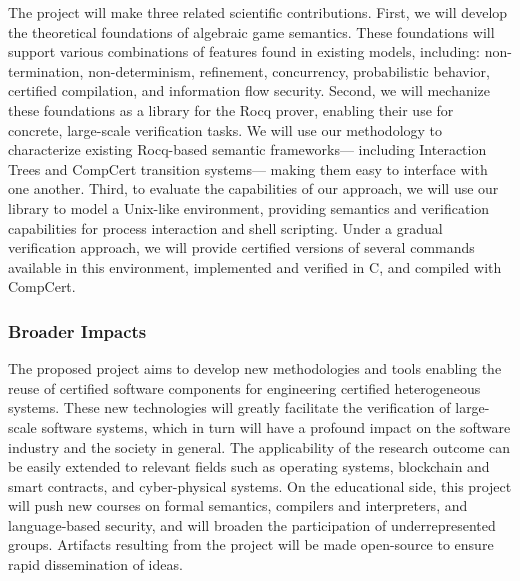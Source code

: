The project will make three related scientific contributions.
First,
we will develop the theoretical foundations of algebraic game semantics.
These foundations will support
various combinations of features found in existing models, including:
non-termination, non-determinism, refinement,
concurrency, probabilistic behavior, certified compilation, and
information flow security.
Second,
we will mechanize these foundations
as a library for the Rocq prover,
enabling their use for concrete, large-scale verification tasks.
We will use our methodology to
characterize existing Rocq-based semantic frameworks---%
including Interaction Trees and CompCert transition systems---%
making them easy to interface with one another.
Third,
to evaluate the capabilities of our approach,
we will use our library to model a Unix-like environment,
providing semantics and verification capabilities
for process interaction and shell scripting.
Under a gradual verification approach,
we will provide certified versions of
several commands available in this environment,
implemented and verified in C,
and compiled with CompCert.

\subsubsection*{Broader Impacts}

The proposed project aims to develop
new methodologies and tools
enabling the reuse of certified software components
for engineering certified heterogeneous systems.
These new technologies
will greatly facilitate the verification
of large-scale software systems, which in turn will have a profound impact
on the software industry and the society in general. The applicability
of the research outcome can be easily extended to relevant fields such
as operating systems, blockchain and smart contracts, and
cyber-physical systems.  On the educational side, this project will
push new courses on formal semantics, compilers and interpreters, and
language-based security, and will broaden the participation of
underrepresented groups.  Artifacts resulting from the project will be
made open-source to ensure rapid dissemination of ideas.

